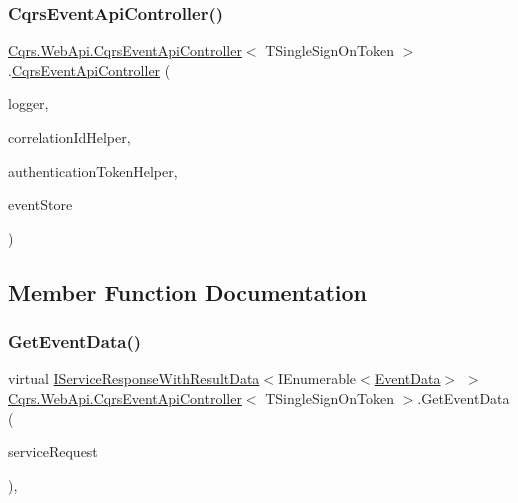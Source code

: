 \subsubsection{\texorpdfstring{Cqrs\+Event\+Api\+Controller()}{CqrsEventApiController()}}
{\footnotesize\ttfamily \hyperlink{classCqrs_1_1WebApi_1_1CqrsEventApiController}{Cqrs.\+Web\+Api.\+Cqrs\+Event\+Api\+Controller}$<$ T\+Single\+Sign\+On\+Token $>$.\hyperlink{classCqrs_1_1WebApi_1_1CqrsEventApiController}{Cqrs\+Event\+Api\+Controller} (\begin{DoxyParamCaption}\item[{I\+Logger}]{logger,  }\item[{I\+Correlation\+Id\+Helper}]{correlation\+Id\+Helper,  }\item[{\hyperlink{interfaceCqrs_1_1Authentication_1_1IAuthenticationTokenHelper}{I\+Authentication\+Token\+Helper}$<$ T\+Single\+Sign\+On\+Token $>$}]{authentication\+Token\+Helper,  }\item[{\hyperlink{interfaceCqrs_1_1Events_1_1IEventStore}{I\+Event\+Store}$<$ T\+Single\+Sign\+On\+Token $>$}]{event\+Store }\end{DoxyParamCaption})\hspace{0.3cm}{\ttfamily [protected]}}



\subsection{Member Function Documentation}
\mbox{\label{classCqrs_1_1WebApi_1_1CqrsEventApiController_aac0079ced115761a0ab605eaebe0801b_aac0079ced115761a0ab605eaebe0801b}} 
\subsubsection{\texorpdfstring{Get\+Event\+Data()}{GetEventData()}}
{\footnotesize\ttfamily virtual \hyperlink{interfaceCqrs_1_1Services_1_1IServiceResponseWithResultData}{I\+Service\+Response\+With\+Result\+Data}$<$I\+Enumerable$<$\hyperlink{classCqrs_1_1Events_1_1EventData}{Event\+Data}$>$ $>$ \hyperlink{classCqrs_1_1WebApi_1_1CqrsEventApiController}{Cqrs.\+Web\+Api.\+Cqrs\+Event\+Api\+Controller}$<$ T\+Single\+Sign\+On\+Token $>$.Get\+Event\+Data (\begin{DoxyParamCaption}\item[{\hyperlink{interfaceCqrs_1_1Services_1_1IServiceRequestWithData}{I\+Service\+Request\+With\+Data}$<$ T\+Single\+Sign\+On\+Token, Guid $>$}]{service\+Request }\end{DoxyParamCaption})\hspace{0.3cm}{\ttfamily [protected]}, {\ttfamily [virtual]}}



